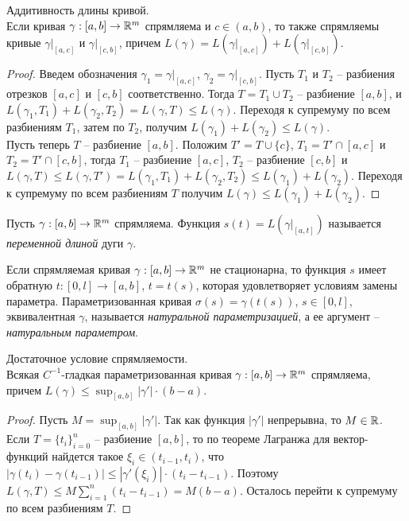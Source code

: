 \begin{lemma}{Аддитивность длины кривой.}\\
    Если кривая $\gamma: [a, b] \to \mathbb{R}^m$ спрямляема и $c \in (a, b)$, то также спрямляемы кривые $\gamma|_{[a, c]}$ и $\gamma|_{[c, b]}$, причем $L(\gamma) = L(\gamma|_{[a, c]}) + L(\gamma|_{[c, b]})$.
\end{lemma}

\begin{proof}
    Введем обозначения $\gamma_{1} = \gamma|_{[a, c]}$, $\gamma_{2} = \gamma|_{[c, b]}$. Пусть $T_{1}$ и $T_{2}$ -- разбиения отрезков $[a, c]$ и $[c, b]$ соответственно. Тогда $T = T_{1} \cup T_{2}$ -- разбиение $[a, b]$, и $L(\gamma_{1}, T_{1}) + L(\gamma_{2}, T_{2}) = L(\gamma, T) \leq L(\gamma)$. Переходя к супремуму по всем разбиениям $T_{1}$, затем по $T_{2}$, получим $L(\gamma_{1}) + L(\gamma_{2}) \leq L(\gamma)$.\\
    Пусть теперь $T$ -- разбиение $[a, b]$. Положим $T' = T \cup \{c\}$, $T_{1} = T' \cap [a, c]$ и $T_{2} = T' \cap [c, b]$, тогда $T_{1}$ -- разбиение $[a, c]$, $T_{2}$ -- разбиение $[c, b]$ и $L(\gamma, T) \leq L(\gamma, T') = L(\gamma_{1}, T_{1}) + L(\gamma_{2}, T_{2}) \leq L(\gamma_{1}) + L(\gamma_{2})$. Переходя к супремуму по всем разбиениям $T$ получим $L(\gamma) \leq L(\gamma_{1}) + L(\gamma_{2})$. 
\end{proof}

\begin{definition}
    Пусть $\gamma: [a, b] \to \mathbb{R}^m$ спрямляема. Функция $s(t) = L(\gamma|_{[a, t]})$ называется \textit{переменной длиной} дуги $\gamma$.
\end{definition}

Если спрямляемая кривая $\gamma: [a, b] \to \mathbb{R}^m$ не стационарна, то функция $s$ имеет обратную $t: [0, l] \to [a, b]$, $t = t(s)$, которая удовлетворяет условиям замены параметра. Параметризованная кривая $\sigma(s) = \gamma(t(s))$, $s \in [0, l]$, эквивалентная $\gamma$, называется \textit{натуральной параметризацией}, а ее аргумент -- \textit{натуральным параметром}.

\begin{lemma}{Достаточное условие спрямляемости.}\\
    Всякая $C^{-1}$-гладкая параметризованная кривая $\gamma: [a, b] \to \mathbb{R}^m$ спрямляема, причем $L(\gamma) \leq \sup_{[a, b]} |\gamma'| \cdot (b - a)$.
\end{lemma}

\begin{proof}
    Пусть $M = \sup_{[a, b]}|\gamma'|$. Так как функция $|\gamma'|$ непрерывна, то $M \in \mathbb{R}$. Если $T = \{t_{i}\}_{i = 0}^{n}$ -- разбиение $[a, b]$, то по теореме Лагранжа для вектор-функций найдется такое $\xi_{i} \in (t_{i-1}, t_{i})$, что $|\gamma(t_{i}) - \gamma(t_{i-1})| \leq |\gamma'(\xi_{i})|\cdot(t_{i} - t_{i - 1})$. Поэтому $L(\gamma, T) \leq M \sum_{i = 1}^{n}(t_{i} - t_{i - 1}) = M(b - a)$. Осталось перейти к супремуму по всем разбиениям $T$. 
\end{proof}

